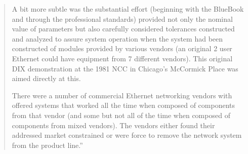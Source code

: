 \documentclass[../HFT-main.tex]{subfiles} %
\begin{document}
\begin{quotation}
\begin{enumerate}
A bit more subtle was the substantial effort (beginning with the BlueBook and through the professional standards)  provided not only the nominal value of parameters but also carefully considered tolerances constructed and analyzed to assure system operation when the system had been constructed of modules provided by various vendors (an original 2 user Ethernet could have equipment from 7 different vendors).  This original DIX demonstration at the 1981 NCC in Chicago's McCormick Place was aimed directly at this.

There were a number of commercial Ethernet networking vendors with offered systems that worked all the time when composed of components from that vendor (and some but not all of the time when composed of components from mixed vendors).  The vendors either found their addressed market constrained or were force to remove the network system from the product line.''

\end{enumerate}
\end{quotation}
\end{document}
